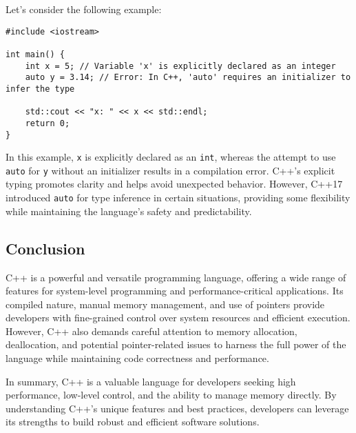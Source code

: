\documentclass{article}
\begin{document}
Let's consider the following example:

\begin{verbatim}
#include <iostream>

int main() {
    int x = 5; // Variable 'x' is explicitly declared as an integer
    auto y = 3.14; // Error: In C++, 'auto' requires an initializer to infer the type

    std::cout << "x: " << x << std::endl;
    return 0;
}
\end{verbatim}

In this example, \texttt{x} is explicitly declared as an \texttt{int}, whereas the attempt to use \texttt{auto} for \texttt{y} without an initializer results in a compilation error. C++'s explicit typing promotes clarity and helps avoid unexpected behavior. However, C++17 introduced \texttt{auto} for type inference in certain situations, providing some flexibility while maintaining the language's safety and predictability.

\subsection{Conclusion}
C++ is a powerful and versatile programming language, offering a wide range of features for system-level programming and performance-critical applications. Its compiled nature, manual memory management, and use of pointers provide developers with fine-grained control over system resources and efficient execution. However, C++ also demands careful attention to memory allocation, deallocation, and potential pointer-related issues to harness the full power of the language while maintaining code correctness and performance.

In summary, C++ is a valuable language for developers seeking high performance, low-level control, and the ability to manage memory directly. By understanding C++'s unique features and best practices, developers can leverage its strengths to build robust and efficient software solutions.
\end{document}
